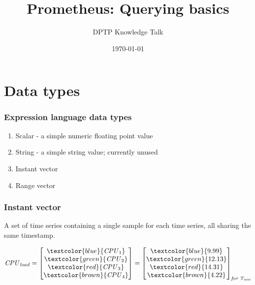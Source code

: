 \documentclass[xcolor=dvipsnames]{beamer}
\title[Prometheus: Querying basics]{Prometheus: Querying basics}
\date{\today}
\author[Jakub Guzik]
{DPTP Knowledge Talk}
\newcommand{\mli}[1]{\mathit{#1}}
\begin{document}
	\begin{frame}
		\titlepage
	\end{frame}

	\begin{frame}
		\tableofcontents
	\end{frame}

	\section{Data types}


	\begin{frame}
	\frametitle{Expression language data types}
		\begin{enumerate}
			\item Scalar - a simple numeric floating point value
\item String - a simple string value; currently unused
\item Instant vector
\item Range vector
		\end{enumerate}
	\end{frame}
	\begin{frame}
	\frametitle{Instant vector}
A set of time series containing a single sample for each time series, all sharing the same timestamp.

\[
\mli{CPU} _ \mli{load}=
\begin{bmatrix}
    \textcolor{blue}{\mli{CPU}_1}      \\
    \textcolor{green}{\mli{CPU}_2}   \\
    \textcolor{red}{\mli{CPU}_3}   \\
    \textcolor{brown}{\mli{CPU}_4}
\end{bmatrix}
=
\begin{bmatrix}
    \textcolor{blue}{9.99}      \\
    \textcolor{green}{12.13}   \\
    \textcolor{red}{14.31}   \\
    \textcolor{brown}{4.22}

\end{bmatrix} _{\mli{for\: T_{\mli{now}}}}
\]

\end{frame}
\end{document}
